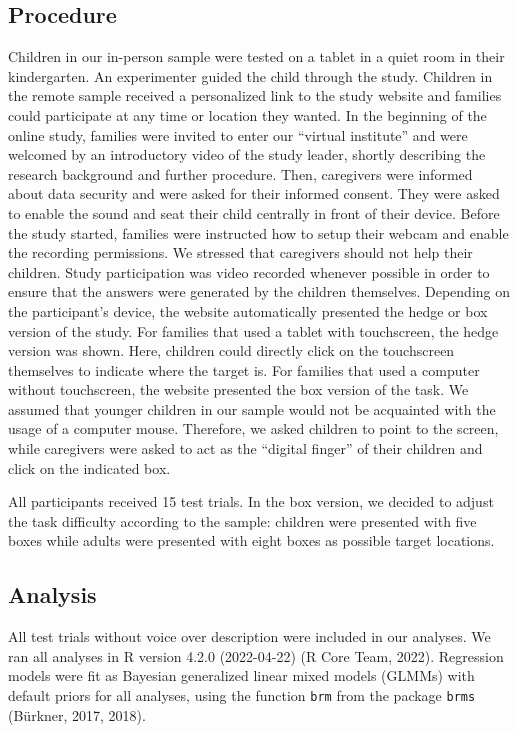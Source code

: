 \documentclass[
  man,floatsintext]{apa6}
\begin{document}
\hypertarget{procedure}{%
\subsection{Procedure}\label{procedure}}

Children in our in-person sample were tested on a tablet in a quiet room in their kindergarten. An experimenter guided the child through the study. Children in the remote sample received a personalized link to the study website and families could participate at any time or location they wanted. In the beginning of the online study, families were invited to enter our ``virtual institute'' and were welcomed by an introductory video of the study leader, shortly describing the research background and further procedure. Then, caregivers were informed about data security and were asked for their informed consent. They were asked to enable the sound and seat their child centrally in front of their device. Before the study started, families were instructed how to setup their webcam and enable the recording permissions. We stressed that caregivers should not help their children. Study participation was video recorded whenever possible in order to ensure that the answers were generated by the children themselves.
Depending on the participant's device, the website automatically presented the hedge or box version of the study. For families that used a tablet with touchscreen, the hedge version was shown. Here, children could directly click on the touchscreen themselves to indicate where the target is. For families that used a computer without touchscreen, the website presented the box version of the task. We assumed that younger children in our sample would not be acquainted with the usage of a computer mouse. Therefore, we asked children to point to the screen, while caregivers were asked to act as the ``digital finger'' of their children and click on the indicated box.

All participants received 15 test trials. In the box version, we decided to adjust the task difficulty according to the sample: children were presented with five boxes while adults were presented with eight boxes as possible target locations.

\hypertarget{analysis}{%
\subsection{Analysis}\label{analysis}}

All test trials without voice over description were included in our analyses. We ran all analyses in R version 4.2.0 (2022-04-22) (R Core Team, 2022). Regression models were fit as Bayesian generalized linear mixed models (GLMMs) with default priors for all analyses, using the function \texttt{brm} from the package \texttt{brms} (Bürkner, 2017, 2018).
\end{document}
